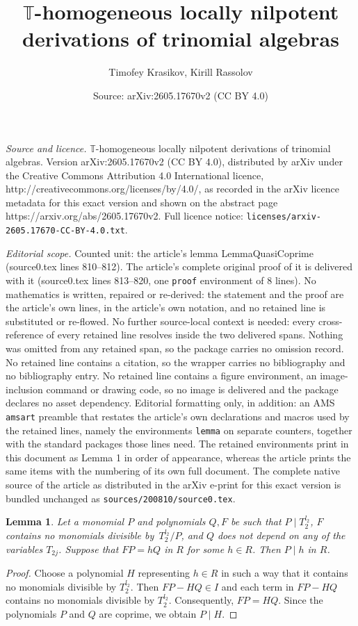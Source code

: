 \documentclass[10pt,a4paper]{amsart}
\title{$\mathbb T$-homogeneous locally nilpotent derivations of trinomial algebras}
\author{Timofey Krasikov, Kirill Rassolov}
\date{Source: arXiv:2605.17670v2 (CC BY 4.0)}
\newtheorem{lemma}{Lemma}
\begin{document}
\maketitle

\noindent\emph{Source and licence.} $\mathbb T$-homogeneous locally nilpotent derivations of trinomial algebras. Version arXiv:2605.17670v2 (CC BY 4.0), distributed by arXiv under the Creative Commons Attribution 4.0 International licence, http://creativecommons.org/licenses/by/4.0/, as recorded in the arXiv licence metadata for this exact version and shown on the abstract page https://arxiv.org/abs/2605.17670v2. Full licence notice: \texttt{licenses/arxiv-2605.17670-CC-BY-4.0.txt}.\par\smallskip

\noindent\textit{Editorial scope.} Counted unit: the article's lemma LemmaQuasiCoprime (source0.tex lines 810--812). The article's complete original proof of it is delivered with it (source0.tex lines 813--820, one \texttt{proof} environment of 8 lines). No mathematics is written, repaired or re-derived: the statement and the proof are the article's own lines, in the article's own notation, and no retained line is substituted or re-flowed.  No further source-local context is needed: every cross-reference of every retained line resolves inside the two delivered spans.  Nothing was omitted from any retained span, so the package carries no omission record.  No retained line contains a citation, so the wrapper carries no bibliography and no bibliography entry.  No retained line contains a figure environment, an image-inclusion command or drawing code, so no image is delivered and the package declares no asset dependency.  Editorial formatting only, in addition: an AMS \texttt{amsart} preamble that restates the article's own declarations and macros used by the retained lines, namely the environments \texttt{lemma} on separate counters, together with the standard packages those lines need.  The retained environments print in this document as Lemma 1 in order of appearance, whereas the article prints the same items with the numbering of its own full document.  The complete native source of the article as distributed in the arXiv e-print for this exact version is bundled unchanged as \texttt{sources/200810/source0.tex}.
    \begin{lemma}\label{LemmaQuasiCoprime}
        Let a monomial $P$ and polynomials $Q, F$ be such that $P\mid T_2^{l_2}$, $F$ contains no monomials divisible by~$T_2^{l_2}/P$, and $Q$ does not depend on any of the variables $T_{2j}$.  Suppose that $FP=hQ$ in $R$ for some $h\in R$. Then $P\mid h$ in $R$.
        \end{lemma}

        \begin{proof}
            Choose a polynomial $H$ representing $h\in R$ in such a way that it contains no monomials divisible by $T_2^{l_2}$. Then
            $
           FP-HQ\in I
            $
            and each term in $FP-HQ$ contains no monomials divisible by $T_2^{l_2}$. Consequently,
            $FP=HQ.$ Since the polynomials $P$ and $Q$ are coprime, we obtain $P\mid H$.
        \end{proof}
\end{document}
